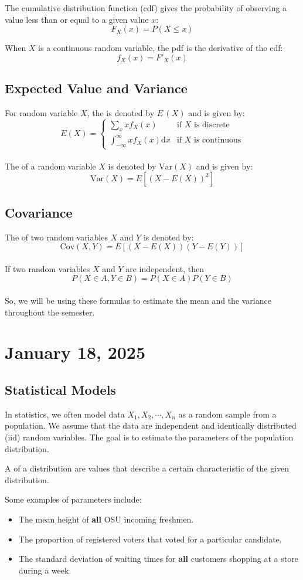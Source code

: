 \documentclass[11pt]{article}
\begin{document}
The cumulative distribution function (cdf) gives the probability of observing a
value less than or equal to a given value $x$: \[F_X(x) = P(X \leq x)\]

When $X$ is a continuous random variable, the pdf is the derivative of the cdf: \[f_X(x) = F'_X(x)\]

\subsection{Expected Value and Variance}
For random variable $X$, the  is denoted by $E \,(X)$ and
is given by:
\[
	E(X) = \begin{cases}
		\sum_{x} x f_X(x)                            & \text{if } X \text{ is discrete}   \\
		\int_{-\infty}^{\infty} x f_X(x) \mathrm{d}x & \text{if } X \text{ is continuous}
	\end{cases}
\]
\\
The  of a random variable $X$ is denoted by $\text{Var}(X)$ and is
given by:
\[
	\text{Var}(X) = E\left[{(X - E(X))}^{2}\right]
\]

\subsection{Covariance}

The  of two random variables $X$ and $Y$ is denoted by:
\[
	\text{Cov}(X, Y) = E\left[(X - E(X))(Y - E(Y))\right]
\]
\\
If two random variables $X$ and $Y$ are independent, then
\[
	P(X\in A, Y \in B) = P(X\in A)P(Y\in B)
\]
\\
So, we will be using these formulas to estimate the mean and the variance throughout the semester.
\section{January 18, 2025}
\subsection{Statistical Models}
In statistics, we often model data $X_1, X_2, \cdots, X_n$ as a random sample
from a population. We assume that the data are independent and identically
distributed (iid) random variables. The goal is to estimate the parameters of
the population distribution.

\begin{definition}
	A  of a distribution are values that describe a certain characteristic of the given distribution.
\end{definition}
Some examples of parameters include:
\begin{itemize}
	\item The mean height of \textbf{all} OSU incoming freshmen.
	\item The proportion of registered voters that voted for a particular candidate.
	\item The standard deviation of waiting times for \textbf{all} customers shopping at
	      a store during a week.
\end{itemize}
\end{document}
